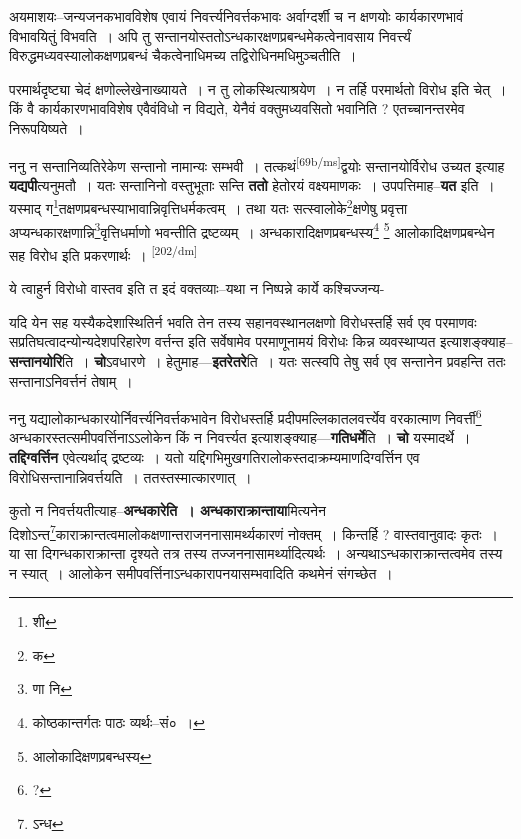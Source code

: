 \documentclass[article,12pt,a4paper]{memoir}
\begin{document}
	  \pstart अयमाशयः--जन्यजनकभावविशेष एवायं निवर्त्त्यनिवर्त्तकभावः अर्वाग्दर्शी च न क्षणयोः कार्यकारणभावं विभावयितुं विभवति । अपि तु सन्तानयोस्ततोऽन्धकारक्षणप्रबन्धमेकत्वेनावसाय निवर्त्त्यं विरुद्धमध्यवस्यालोकक्षणप्रबन्धं चैकत्वेनाधिमच्य तद्विरोधिनमधिमुञ्चतीति ।
	\pend
      

	  \pstart परमार्थदृष्ट्या चेदं क्षणोल्लेखेनाख्यायते । न तु लोकस्थित्याश्रयेण । न तर्हि परमार्थतो विरोध इति चेत् । किं वै कार्यकारणभावविशेष एवैवंविधो न विद्यते, येनैवं वक्तुमध्यवसितो भवानिति ? एतच्चानन्तरमेव निरूपयिष्यते ।
	\pend
      

	  \pstart ननु न सन्तानिव्यतिरेकेण सन्तानो नामान्यः सम्भवी । तत्कथं\leavevmode\textsuperscript{\rmlatinfont\tiny [69b/ms]}द्वयोः सन्तानयोर्विरोध उच्यत इत्याह \textbf{यद्यपी}त्यनुमतौ । यतः सन्तानिनो वस्तुभूताः सन्ति \textbf{ततो} हेतोरयं वक्ष्यमाणकः । उपपत्तिमाह--\textbf{यत} इति । यस्माद् ग\footnote{शी}तक्षणप्रबन्धस्याभावान्निवृत्तिधर्मकत्वम् । तथा यतः सत्स्वालोके\footnote{क}क्षणेषु प्रवृत्ता अप्यन्धकारक्षणान्नि\footnote{णा नि}वृत्तिधर्माणो भवन्तीति द्रष्टव्यम् । अन्धकारादिक्षणप्रबन्धस्य\footnote{कोष्ठकान्तर्गतः पाठः व्यर्थः--सं० ।} \footnote{आलोकादिक्षणप्रबन्धस्य} आलोकादिक्षणप्रबन्धेन सह विरोध इति प्रकरणार्थः ।
	\pend
      \leavevmode\textsuperscript{\rmlatinfont\tiny [202/dm]}

	  \pstart ये त्वाहुर्न विरोधो वास्तव इति त इदं वक्तव्याः--यथा न निष्पन्ने कार्ये कश्चिज्जन्य-
	\pend
      

	  \pstart यदि येन सह यस्यैकदेशास्थितिर्न भवति तेन तस्य सहानवस्थानलक्षणो विरोधस्तर्हि सर्व एव परमाणवः सप्रतिघत्वादन्योन्यदेशपरिहारेण वर्त्तन्त इति सर्वेषामेव परमाणूनामयं विरोधः किन्न व्यवस्थाप्यत इत्याशङ्क्याह--\textbf{सन्तानयोरि}ति । \textbf{चो}ऽवधारणे । हेतुमाह—\textbf{इतरेतरे}ति । यतः सत्स्वपि तेषु सर्व एव सन्तानेन प्रवहन्ति ततः सन्तानाऽनिवर्त्तनं तेषाम् ।
	\pend
      

	  \pstart ननु यद्यालोकान्धकारयोर्निवर्त्त्यनिवर्त्तकभावेन विरोधस्तर्हि प्रदीपमल्लिकातलवर्त्त्येव वरकात्माण निवर्त्ती\footnote{?} अन्धकारस्तत्समीपवर्त्तिनाऽऽलोकेन किं न निवर्त्त्यत इत्याशङ्क्याह—\textbf{गतिधर्मे}ति । \textbf{चो} यस्मादर्थे । \textbf{तद्दिग्वर्त्तिन} एवेत्यर्थाद् द्रष्टव्यः । यतो यद्दिगभिमुखगतिरालोकस्तदाक्रम्यमाणदिग्वर्त्तिन एव विरोधिसन्तानान्निवर्त्तयति । ततस्तस्मात्कारणात् ।
	\pend
      

	  \pstart कुतो न निवर्त्तयतीत्याह--\textbf{अन्धकारेति । अन्धकाराक्रान्ताया}मित्यनेन दिशोऽन्त\footnote{ऽन्ध}काराक्रान्तत्वमालोकक्षणान्तराजननासामर्थ्यकारणं नोक्तम् । किन्तर्हि ? वास्तवानुवादः कृतः । या सा दिगन्धकाराक्रान्ता दृश्यते तत्र तस्य तज्जननासामर्थ्यादित्यर्थः । अन्यथाऽन्धकाराक्रान्तत्वमेव तस्य न स्यात् । आलोकेन समीपवर्त्तिनाऽन्धकारापनयासम्भवादिति कथमेनं संगच्छेत ।
	\pend
      
\end{document}
